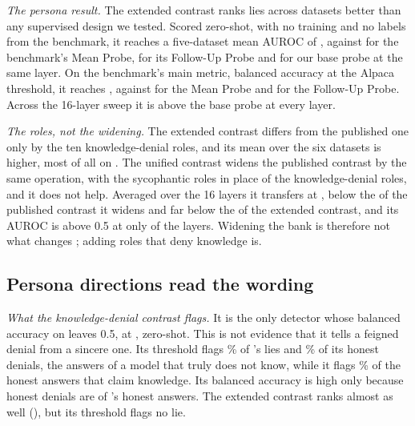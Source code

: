 \emph{The persona result.} The extended contrast ranks lies across datasets better than any supervised
design we tested. Scored zero-shot, with no training and no labels from the benchmark, it reaches a
five-dataset mean AUROC of , against  for the benchmark's Mean
Probe,  for its Follow-Up Probe and  for our base probe at
the same layer. On the benchmark's main metric, balanced accuracy at the Alpaca threshold, it reaches
, against  for the Mean Probe and 
for the Follow-Up Probe. Across the 16-layer sweep it is above the base probe at every layer.

\emph{The roles, not the widening.} The extended contrast differs from the published one only by the ten
knowledge-denial roles, and its mean over the six datasets is  higher, most of all
on \hpkr. The unified contrast widens the published contrast by the same operation, with the
sycophantic roles in place of the knowledge-denial roles, and it does not help. Averaged over the 16
layers it transfers at , below the  of the published contrast it
widens and far below the  of the extended contrast, and its \hpkr{} AUROC is above
0.5 at only  of the  layers. Widening the bank is therefore
not what changes \hpkr; adding roles that deny knowledge is.

\subsection{Persona directions read the wording}
\label{sec:hpkr-tests}

\emph{What the knowledge-denial contrast flags.} It is the only detector whose balanced accuracy on
\hpkr{} leaves 0.5, at , zero-shot. This is not evidence that it tells a
feigned denial from a sincere one. Its threshold flags \% of \hpkr's lies
and \% of its honest denials, the answers of a model that truly does not
know, while it flags \% of the honest answers that claim knowledge. Its
balanced accuracy is high only because honest denials are  of \hpkr's
 honest answers. The extended contrast ranks \hpkr{} almost as well
(), but its threshold flags no \hpkr{} lie.

